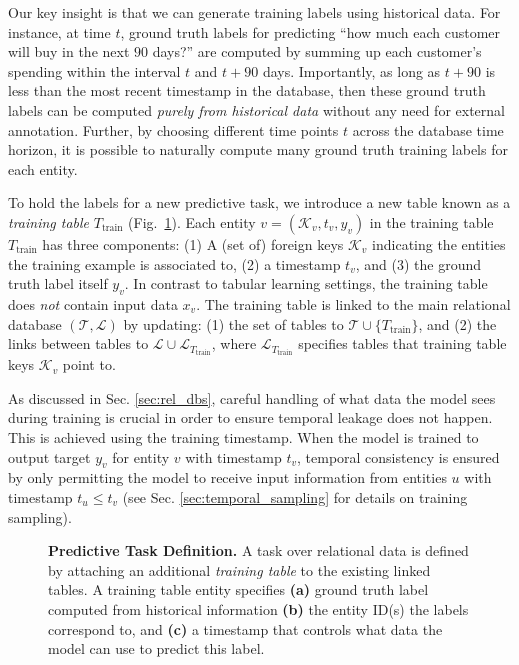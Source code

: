 Our key insight is that we can generate training labels using historical data.
For instance, at time $t$, ground truth labels for predicting ``how much each customer will buy in the next $90$ days?'' are computed by summing up each customer's spending within the interval $t$ and $t+90$ days. Importantly, as long as $t+90$ is less than the most recent timestamp in the database, then these ground truth labels can be computed \emph{purely from historical data} without any need for external annotation. Further, by choosing different time points $t$ across the database time horizon, it is possible to naturally compute many ground truth training labels for each entity.

To hold the labels for a new predictive task, we introduce a new table known as a \emph{training table} $T_\text{train}$ (Fig.~\ref{fig:training_table}).
 Each entity $v=(\mathcal K_v,t_v,y_v)$ in the training table $T_\text{train}$ has three components: (1) A (set of) foreign keys $\mathcal K_v$ indicating the entities the training example is associated to, (2) a timestamp $t_v$, and (3) the ground truth label itself $y_v$.  In contrast to tabular learning settings, the training table does \emph{not} contain input data $x_v$. The training table is linked to the main relational database $(\mathcal T, \mathcal L)$ by updating: (1)  the set of tables to $\mathcal T  \cup \{{T_\text{train}}\}$, and (2) the links between tables to $ \mathcal L \cup \mathcal{L}_{T_\text{train}}$, where $\mathcal{L}_{T_\text{train}}$ specifies tables that training table keys $\mathcal K_v$ point to. 
 
 
As discussed in Sec. \ref{sec:rel_dbs}, careful handling of what data the model sees during training is crucial in order to ensure temporal leakage does not happen. This is achieved using the training timestamp. When the model is trained to output target $y_v$ for entity $v$ with timestamp $t_v$, temporal consistency is ensured by only permitting the model to receive input information from entities $u$ with timestamp $t_u \leq t_v$ (see Sec. \ref{sec:temporal_sampling} for details on training sampling). 
 

\begin{figure}[t] %
  \centering
    \vspace{-0.4cm}
  \caption{\textbf{Predictive Task Definition.} A task over relational data is defined by attaching an additional \emph{training table} to the existing linked tables. A training table entity specifies \textbf{(a)} ground truth label computed from historical information \textbf{(b)} the entity ID(s) the labels correspond to, and \textbf{(c)} a timestamp that controls what data the model can use to predict this label.}
  \label{fig:training_table}
\end{figure}


